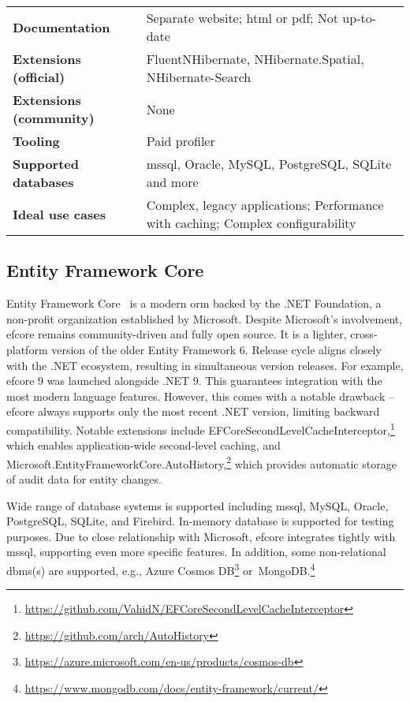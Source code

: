 {\begin{landscape}
\begin{table}[p]
\begin{tabular}{
>{\raggedright\arraybackslash}p{40.00mm}
>{\arraybackslash}p{150.00mm}
}
\textbf{Documentation} & Separate website; \acrshort{html} or \acrshort{pdf}; Not up-to-date\\
\textbf{Extensions (official)} & FluentNHibernate, NHibernate.Spatial, NHibernate-Search  \\
\textbf{Extensions (community)} & None \\
\textbf{Tooling} & Paid profiler \\
\textbf{Supported databases} & \acrshort{mssql}, Oracle, MySQL, PostgreSQL, SQLite and more  \\
\textbf{Ideal use cases} & Complex, legacy applications; Performance with caching; Complex configurability \\
\bottomrule
\end{tabular}
\end{table}
\end{landscape}
}

\subsection{Entity Framework Core}
Entity Framework Core~\cite{efcore, efcoreRepo} is a modern \acrshort{orm} backed by the .NET Foundation, a non-profit organization established by Microsoft. Despite Microsoft's involvement, \acrshort{efcore} remains community-driven and fully open source. It is a lighter, cross-platform version of the older Entity Framework 6. Release cycle aligns closely with the .NET ecosystem, resulting in simultaneous version releases. For example, \acrshort{efcore} 9 was launched alongside .NET 9. This guarantees integration with the most modern language features. However, this comes with a notable drawback -- \acrshort{efcore} always supports only the most recent .NET version, limiting backward compatibility. Notable extensions include EFCoreSecondLevelCacheInterceptor,\footnote{\url{https://github.com/VahidN/EFCoreSecondLevelCacheInterceptor}} which enables application-wide second-level caching, and Microsoft.EntityFrameworkCore.AutoHistory,\footnote{\url{https://github.com/arch/AutoHistory}} which provides automatic storage of audit data for entity changes.

Wide range of database systems is supported including \acrshort{mssql}, MySQL, Oracle, PostgreSQL, SQLite, and Firebird. In-memory database is supported for testing purposes. Due to close relationship with Microsoft, \acrshort{efcore} integrates tightly with \acrshort{mssql}, supporting even more specific features. In addition, some non-relational \acrshort{dbms}(s) are supported, e.g., Azure Cosmos DB\footnote{\url{https://azure.microsoft.com/en-us/products/cosmos-db}} or~MongoDB.\footnote{\url{https://www.mongodb.com/docs/entity-framework/current/}}

